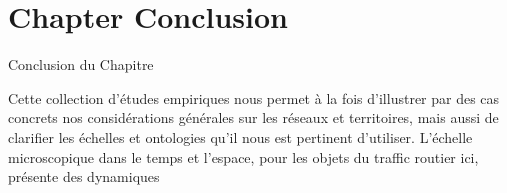 



\newpage


\section*{Chapter Conclusion}{Conclusion du Chapitre}





Cette collection d'études empiriques nous permet à la fois d'illustrer par des cas concrets nos considérations générales sur les réseaux et territoires, mais aussi de clarifier les échelles et ontologies qu'il nous est pertinent d'utiliser. L'échelle microscopique dans le temps et l'espace, pour les objets du traffic routier ici, présente des dynamiques 









\stars

